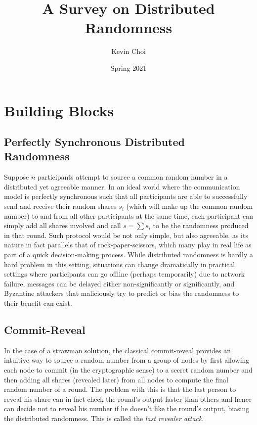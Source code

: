 \documentclass[11pt]{article}
\title{A Survey on Distributed Randomness}
\author{Kevin Choi}
\date{Spring 2021}
\theoremstyle{definition}
\theoremstyle{remark}
\begin{document}
\maketitle
\tableofcontents
\pagebreak

\section{Building Blocks}
\subsection{Perfectly Synchronous Distributed Randomness}
Suppose $n$ participants attempt to source a common random number in a distributed yet agreeable manner. In an ideal world where the communication model is perfectly synchronous such that all participants are able to successfully send and receive their random shares $s_i$ (which will make up the common random number) to and from all other participants at the same time, each participant can simply add all shares involved and call $s = \sum s_i$ to be the randomness produced in that round. Such protocol would be not only simple, but also agreeable, as its nature in fact parallels that of rock-paper-scissors, which many play in real life as part of a quick decision-making process. While distributed randomness is hardly a hard problem in this setting, situations can change dramatically in practical settings where participants can go offline (perhaps temporarily) due to network failure, messages can be delayed either non-significantly or significantly, and Byzantine attackers that maliciously try to predict or bias the randomness to their benefit can exist.


\subsection{Commit-Reveal}
In the case of a strawman solution, the classical commit-reveal provides an intuitive way to source a random number from a group of nodes by first allowing each node to commit (in the cryptographic sense) to a secret random number and then adding all shares (revealed later) from all nodes to compute the final random number of a round. The problem with this is that the last person to reveal his share can in fact check the round's output faster than others and hence can decide not to reveal his number if he doesn't like the round's output, biasing the distributed randomness. This is called the \textit{last revealer attack}.
\end{document}

